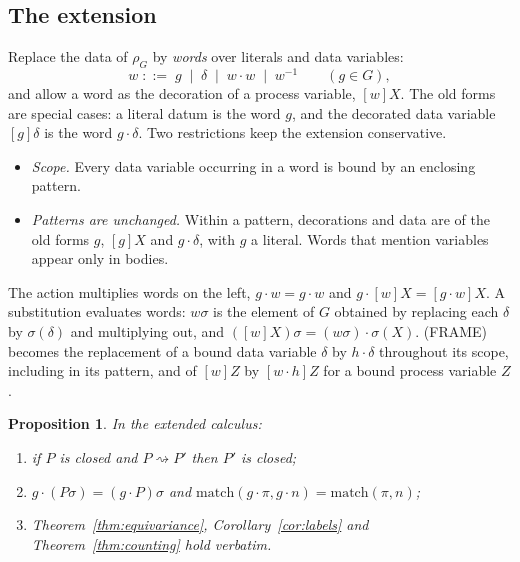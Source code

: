 \documentclass[11pt]{article}
\newtheorem{proposition}[theorem]{Proposition}
\theoremstyle{definition}
\theoremstyle{remark}
\newcommand{\calc}{\rho_G}
\newcommand{\act}[2]{#1\cdot #2}
\newcommand{\red}{\rightsquigarrow}
\newcommand{\match}{\mathrm{match}}
\newcommand{\fr}[2]{[#1]#2}
\begin{document}
\subsection{The extension}

Replace the data of $\calc$ by \emph{words} over literals and data variables:
\[
w \;::=\; g \;\mid\; \delta \;\mid\; w\cdot w \;\mid\; w^{-1}
\qquad (g\in G),
\]
and allow a word as the decoration of a process variable, $\fr{w}{X}$. The
old forms are special cases: a literal datum is the word $g$, and the
decorated data variable $\fr{g}{\delta}$ is the word $g\cdot\delta$. Two
restrictions keep the extension conservative.

\begin{itemize}[leftmargin=1.5em]
\item \emph{Scope.} Every data variable occurring in a word is bound by an
  enclosing pattern.
\item \emph{Patterns are unchanged.} Within a pattern, decorations and data
  are of the old forms $g$, $\fr{g}{X}$ and $g\cdot\delta$, with $g$ a literal.
  Words that mention variables appear only in bodies.
\end{itemize}

The action multiplies words on the left, $\act{g}{w}=g\cdot w$ and
$\act{g}{\fr{w}{X}}=\fr{g\cdot w}{X}$. A substitution evaluates words:
$w\sigma$ is the element of $G$ obtained by replacing each $\delta$ by
$\sigma(\delta)$ and multiplying out, and $(\fr{w}{X})\sigma =
\act{(w\sigma)}{\sigma(X)}$. (FRAME) becomes the replacement of a bound data
variable $\delta$ by $h\cdot\delta$ throughout its scope, including in its
pattern, and of $\fr{w}{Z}$ by $\fr{w\cdot h}{Z}$ for a bound process
variable $Z$.

\begin{proposition}\label{prop:dyn}
In the extended calculus:
\begin{enumerate}[label=(\roman*)]
\item if $P$ is closed and $P\red P'$ then $P'$ is closed;
\item $\act{g}{(P\sigma)}=(\act{g}{P})\sigma$ and
  $\match(\act{g}{\pi},\act{g}{n})=\match(\pi,n)$;
\item Theorem~\ref{thm:equivariance}, Corollary~\ref{cor:labels} and
  Theorem~\ref{thm:counting} hold verbatim.
\end{enumerate}
\end{proposition}
\end{document}
